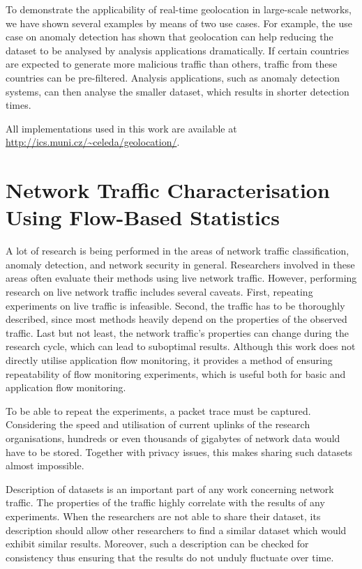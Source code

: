 To demonstrate the applicability of real-time geolocation in large-scale networks, we have shown several examples by means of two use cases. For example, the use case on anomaly detection has shown that geolocation can help reducing the dataset to be analysed by analysis applications dramatically. If certain countries are expected to generate more malicious traffic than others, traffic from these countries can be pre-filtered. Analysis applications, such as anomaly detection systems, can then analyse the smaller dataset, which results in shorter detection times.

All implementations used in this work are available at \url{http://ics.muni.cz/~celeda/geolocation/}.




\section{Network Traffic Characterisation Using Flow-Based Statistics}\label{sec:analysis-characterisation}

A lot of research is being performed in the areas of network traffic classification, anomaly detection, and network security in general. Researchers involved in these areas often evaluate their methods using live network traffic. However, performing research on live network traffic includes several caveats. First, repeating experiments on live traffic is infeasible. Second, the traffic has to be thoroughly described, since most methods heavily depend on the properties of the observed traffic. Last but not least, the network traffic's properties can change during the research cycle, which can lead to suboptimal results. Although this work does not directly utilise application flow monitoring, it provides a method of ensuring repeatability of flow monitoring experiments, which is useful both for basic and application flow monitoring.

To be able to repeat the experiments, a packet trace must be captured. Considering the speed and utilisation of current uplinks of the research organisations, hundreds or even thousands of gigabytes of network data would have to be stored. Together with privacy issues, this makes sharing such datasets almost impossible. 

Description of datasets is an important part of any work concerning network traffic. The properties of the traffic highly correlate with the results of any experiments. When the researchers are not able to share their dataset, its description should allow other researchers to find a similar dataset which would exhibit similar results. Moreover, such a description can be checked for consistency thus ensuring that the results do not unduly fluctuate over time.

